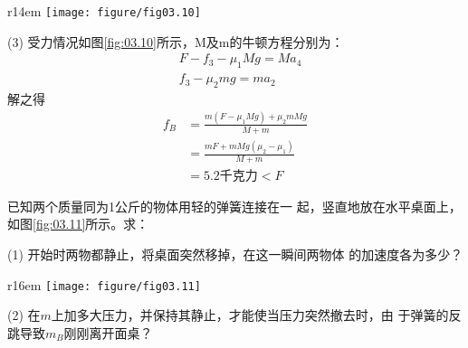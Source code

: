 \documentclass[../outline-of-mechanics.tex]{subfiles}
\begin{document}
\begin{wrapfigure}[5]{r}{14em}
  \centering
  \texttt{[image: figure/fig03.10]}
  \caption{}
  \label{fig:03.10}
\end{wrapfigure}
(3) 受力情况如图\ref{fig:03.10}所示，M及m的牛顿方程分别为：
{\setlength{\mathindent}{2em}
\begin{align*}
   & F - f _ { 3 } - \mu _ { 1 } M g = M a _ { 4 } \\
   & f _ { 3 } - \mu _ { 2 } m g = m a _ { 2 }
\end{align*}}
解之得
\begin{align*}
  f _ { B } & = \frac { m \left( F - \mu _ { 1 } M g \right) + \mu _ { 2 } m M g } { M + m } \\
            & = \frac { m F + m M g \left( \mu _ { 2 } - \mu _ { 1 } \right) } { M + m }     \\
            & = 5.2 \text{千克力} < F
\end{align*}

\example 已知两个质量同为1公斤的物体用轻的弹簧连接在一
起，竖直地放在水平桌面上，如图\ref{fig:03.11}所示。求：

(1) 开始时两物都静止，将桌面突然移掉，在这一瞬间两物体
的加速度各为多少？

\begin{wrapfigure}[10]{r}{16em}
  \centering
  \texttt{[image: figure/fig03.11]}
  \caption{}
  \label{fig:03.11}
\end{wrapfigure}
(2) 在$ m $上加多大压力，并保持其静止，才能使当压力突然撤去时，由
于弹簧的反跳导致$ m_B $刚刚离开面桌？
\end{document}
